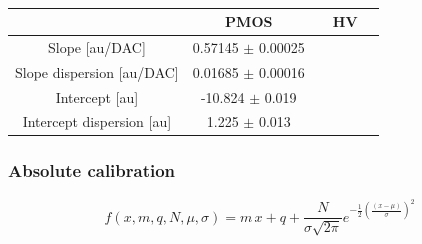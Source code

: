         \begin{table}
            \begin{center}
            \begin{tabular}{| c  c | c | c |c |}
            \hline
             & PMOS & & HV \\
            \hline
            \hline
            Slope [au/DAC] & 0.57145 $\pm$ 0.00025 \\
            Slope dispersion [au/DAC] &  0.01685 $\pm$ 0.00016\\
            Intercept [au] & -10.824 $\pm$ 0.019 \\
            Intercept dispersion [au] & 1.225 $\pm$ 0.013\\
            \hline
            \end{tabular}
            \caption{}
            \label{tab:}
            \end{center}
        \end{table}        

        \subsubsection{Absolute calibration}
        \begin{equation}
            f(x, m, q, N, \mu, \sigma) = m\,x + q + \frac{N}{\sigma \sqrt{2\pi}} e^{-\frac{1}{2}(\frac{(x-\mu)}{\sigma})^2}
        \end{equation}   
         
